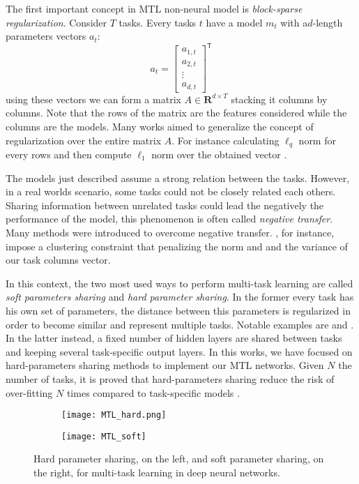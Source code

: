 The first important concept in MTL non-neural model is \emph{block-sparse regularization}. Consider $T$ tasks. Every tasks $t$ have a model $m_t$ with  a$d$-length parameters vectors $a_t$: 
\begin{equation}
a_t = \begin{bmatrix}
           a_{1, t} \\
           a_{2, t} \\
           \vdots \\
           a_{d, t}
         \end{bmatrix}^\mathsf{T}
\end{equation}
using these vectors we can form a matrix $A \in \mathbf{R}^{d \times T}$ stacking it columns by columns. Note that the rows of the matrix are the features considered while the columns are the models. Many works aimed to generalize the concept of regularization over the entire matrix $A$. For instance calculating $\ell_q$ norm for every rows and then compute $\ell_1$ norm over the obtained vector \cite{Ruder2017, Zhang2008, ArgyriouPontil2008, YuanLin2006}.  

The models just described assume a strong relation between the tasks. However, in a real worlds scenario, some tasks could not be closely related each others. Sharing information between unrelated tasks could lead the negatively the performance of the model, this phenomenon is often called \emph{negative transfer}. 
Many methods were introduced to overcome negative transfer. \cite{Evgeniou2005}, for instance, impose a clustering constraint that penalizing the norm and and the variance of our task columns vector.

In this context, the two
most used ways to perform multi-task learning are called \emph{soft
parameters sharing} and \emph{hard parameter sharing}. In the former
every task has his own set of parameters, the distance between this
parameters is regularized in order to become similar and represent
multiple tasks. Notable examples are \cite{duong-etal-2015-low} and
\cite{yang2016trace}. In the latter instead, a fixed number of hidden
layers are shared between tasks and keeping several task-specific output
layers. In this works, we have focused on hard-parameters sharing methods
to implement our MTL networks. Given $N$ the number of tasks, it is proved
that hard-parameters sharing reduce the risk of over-fitting $N$ times
compared to task-specific models \cite{baxter1997}.
\begin{figure}
\centering
\begin{subfigure}{.5\textwidth}
  \centering
  \texttt{[image: MTL\_hard.png]}
  \label{fig:sub1}
\end{subfigure}%
\begin{subfigure}{.5\textwidth}
  \centering
  \texttt{[image: MTL\_soft]}
  \label{fig:sub2}
\end{subfigure}
\caption{Hard parameter sharing, on the left, and soft parameter sharing, on the right, for multi-task learning in deep neural networks.}
\label{fig:test}
\end{figure}

